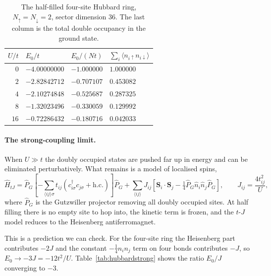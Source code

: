 \begin{table}[h]
\centering
\renewcommand{\arraystretch}{1.25}
\setlength{\tabcolsep}{12pt}
\begin{tabular}{rlll}
\toprule
$U/t$ & $E_0/t$ & $E_0/(Nt)$ & $\sum_i\langle n_{i\uparrow}n_{i\downarrow}\rangle$\\
\midrule
$0$  & $-4.00000000$ & $-1.000000$ & $1.000000$\\
$2$  & $-2.82842712$ & $-0.707107$ & $0.453082$\\
$4$  & $-2.10274848$ & $-0.525687$ & $0.287325$\\
$8$  & $-1.32023496$ & $-0.330059$ & $0.129992$\\
$16$ & $-0.72286432$ & $-0.180716$ & $0.042033$\\
\bottomrule
\end{tabular}
\caption{The half-filled four-site Hubbard ring, $N_{\uparrow}=N_{\downarrow}
=2$, sector dimension $36$.  The last column is the total double occupancy in
the ground state.}
\label{tab:hubbard}
\end{table}

\paragraph{The strong-coupling limit.}
When $U\gg t$ the doubly occupied states are pushed far up in energy and can
be eliminated perturbatively.  What remains is a model of localised spins,
\begin{equation}
  \hat{H}_{tJ} = \hat{P}_G\left[
    -\sum_{\langle ij\rangle\sigma}t_{ij}
      \left(c^{\dagger}_{i\sigma}c_{j\sigma}+\mathrm{h.c.}\right)
    \right]\hat{P}_G
  + \sum_{\langle ij\rangle}J_{ij}
    \left[\bm{S}_i\cdot\bm{S}_j
      - \tfrac14\hat{P}_G\hat{n}_i\hat{n}_j\hat{P}_G\right],
  \qquad J_{ij}=\frac{4t_{ij}^2}{U},
  \label{eq:4-tJ}
\end{equation}
where $\hat{P}_G$ is the Gutzwiller projector removing all doubly occupied
sites.  At half filling there is no empty site to hop into, the kinetic term
is frozen, and the $t$-$J$ model reduces to the Heisenberg antiferromagnet.

This is a prediction we can check.  For the four-site ring the Heisenberg part
contributes $-2J$ and the constant $-\tfrac14 n_i n_j$ term on four bonds
contributes $-J$, so $E_0\rightarrow-3J=-12t^2/U$.
Table~\ref{tab:hubbardstrong} shows the ratio $E_0/J$ converging to $-3$.

